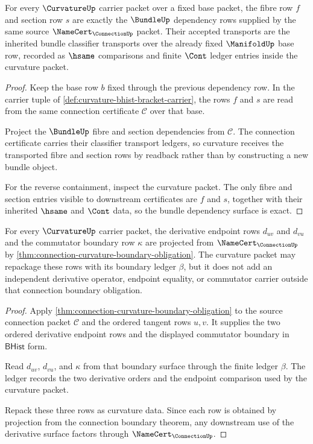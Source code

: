 \begin{theorem}
\label{thm:curvature-bundle-fibre-dependency-row}
For every $\CurvatureUp$ carrier packet over a fixed base packet, the fibre row $f$ and section row $s$ are exactly the $\BundleUp$ dependency rows supplied by the same source $\NameCert_{\ConnectionUp}$ packet. Their accepted transports are the inherited bundle classifier transports over the already fixed $\ManifoldUp$ base row, recorded as $\hsame$ comparisons and finite $\Cont$ ledger entries inside the curvature packet.
\end{theorem}
\begin{proof}
Keep the base row $b$ fixed through the previous dependency row. In the carrier tuple of \autoref{def:curvature-bhist-bracket-carrier}, the rows $f$ and $s$ are read from the same connection certificate $\mathcal{C}$ over that base.

Project the $\BundleUp$ fibre and section dependencies from $\mathcal{C}$. The connection certificate carries their classifier transport ledgers, so curvature receives the transported fibre and section rows by readback rather than by constructing a new bundle object.

For the reverse containment, inspect the curvature packet. The only fibre and section entries visible to downstream certificates are $f$ and $s$, together with their inherited $\hsame$ and $\Cont$ data, so the bundle dependency surface is exact.
\end{proof}

\begin{theorem}
\label{thm:curvature-connection-derivative-dependency-row}
For every $\CurvatureUp$ carrier packet, the derivative endpoint rows $d_{uv}$ and $d_{vu}$ and the commutator boundary row $\kappa$ are projected from $\NameCert_{\ConnectionUp}$ by \autoref{thm:connection-curvature-boundary-obligation}. The curvature packet may repackage these rows with its boundary ledger $\beta$, but it does not add an independent derivative operator, endpoint equality, or commutator carrier outside that connection boundary obligation.
\end{theorem}
\begin{proof}
Apply \autoref{thm:connection-curvature-boundary-obligation} to the source connection packet $\mathcal{C}$ and the ordered tangent rows $u,v$. It supplies the two ordered derivative endpoint rows and the displayed commutator boundary in $\mathsf{BHist}$ form.

Read $d_{uv}$, $d_{vu}$, and $\kappa$ from that boundary surface through the finite ledger $\beta$. The ledger records the two derivative orders and the endpoint comparison used by the curvature packet.

Repack these three rows as curvature data. Since each row is obtained by projection from the connection boundary theorem, any downstream use of the derivative surface factors through $\NameCert_{\ConnectionUp}$.
\end{proof}


